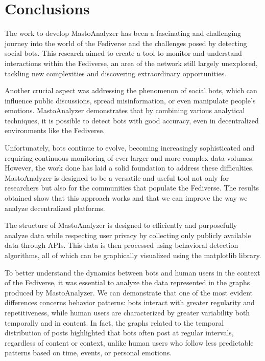 \chapter*{Conclusions}

The work to develop MastoAnalyzer has been a fascinating and challenging journey into the world of the Fediverse and the challenges posed by detecting social bots. This research aimed to create a tool to monitor and understand interactions within the Fediverse, an area of the network still largely unexplored, tackling new complexities and discovering extraordinary opportunities.

Another crucial aspect was addressing the phenomenon of social bots, which can influence public discussions, spread misinformation, or even manipulate people's emotions. MastoAnalyzer demonstrates that by combining various analytical techniques, it is possible to detect bots with good accuracy, even in decentralized environments like the Fediverse.

Unfortunately, bots continue to evolve, becoming increasingly sophisticated and requiring continuous monitoring of ever-larger and more complex data volumes. However, the work done has laid a solid foundation to address these difficulties. MastoAnalyzer is designed to be a versatile and useful tool not only for researchers but also for the communities that populate the Fediverse. The results obtained show that this approach works and that we can improve the way we analyze decentralized platforms.

The structure of MastoAnalyzer is designed to efficiently and purposefully analyze data while respecting user privacy by collecting only publicly available data through APIs. This data is then processed using behavioral detection algorithms, all of which can be graphically visualized using the matplotlib library.

To better understand the dynamics between bots and human users in the context of the Fediverse, it was essential to analyze the data represented in the graphs produced by MastoAnalyzer. We can demonstrate that one of the most evident differences concerns behavior patterns: bots interact with greater regularity and repetitiveness, while human users are characterized by greater variability both temporally and in content. In fact, the graphs related to the temporal distribution of posts highlighted that bots often post at regular intervals, regardless of content or context, unlike human users who follow less predictable patterns based on time, events, or personal emotions.

